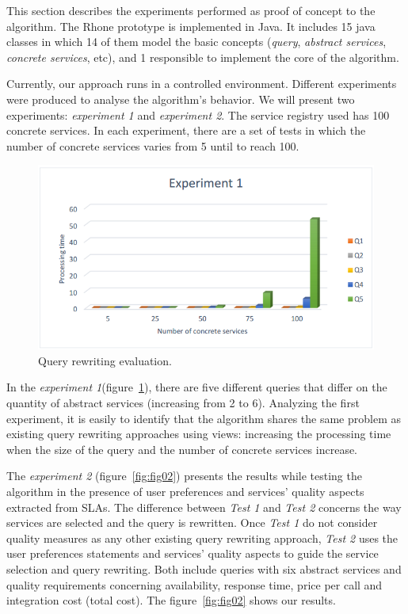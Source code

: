This section describes the experiments performed as proof of concept to the algorithm.
The Rhone prototype is implemented in Java.
It includes 15 java classes in which 14 of them model the basic concepts 
(\textit{query}, \textit{abstract services}, \textit{concrete services}, etc), 
and 1 responsible to implement the core of the algorithm. 

Currently, our approach runs in a controlled environment. 
Different experiments were produced to analyse the algorithm's behavior.
We will present two experiments: \textit{experiment 1} and \textit{experiment 2}.
The service registry used has 100 concrete services. 
In each experiment, there are a set of tests in which the number of concrete 
services varies from 5 until to reach 100.

\begin{figure}[!h]
\centering
\includegraphics[scale=0.4]{exp1.png}
\caption{Query rewriting evaluation.}\label{fig01}
\end{figure} 

In the \textit{experiment 1}(figure~\ref{fig01}), there are five different queries that differ on
the quantity of abstract services (increasing from 2 to 6). Analyzing the first
experiment, it is easily to identify that the algorithm shares the same problem
as existing query rewriting approaches using views: increasing the
processing time when the size of the query and the number of concrete services increase.


The \textit{experiment 2} (figure~\ref{fig:fig02}) presents the results while testing the algorithm in the presence of user preferences and services' quality aspects extracted from SLAs.  The difference between \textit{Test 1} and \textit{Test 2} concerns the way services are selected and the query is rewritten. Once \textit{Test 1} do not consider quality measures as any other existing query rewriting approach, \textit{Test 2} uses the user preferences statements and services' quality aspects to guide the service selection and query rewriting.
Both include queries with six abstract services and quality requirements concerning availability, response time, price per call and integration cost (total cost). The figure~\ref{fig:fig02} shows our results. 

